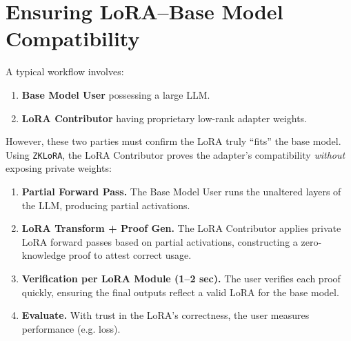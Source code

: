 \documentclass[11pt]{article}
\begin{document}
\section{Ensuring LoRA–Base Model Compatibility}

A typical workflow involves:
\begin{enumerate}
    \item \textbf{Base Model User} possessing a large LLM. 
    \item \textbf{LoRA Contributor} having proprietary low-rank adapter weights. 
\end{enumerate}
However, these two parties must confirm the LoRA truly “fits” the base model. Using \texttt{ZKLoRA}, the LoRA Contributor proves the adapter’s compatibility \emph{without} exposing private weights:

\begin{enumerate}
    \item \textbf{Partial Forward Pass.}
    The Base Model User runs the unaltered layers of the LLM, producing partial activations.

    \item \textbf{LoRA Transform + Proof Gen.}
    The LoRA Contributor applies private LoRA forward passes based on partial activations, constructing a zero-knowledge proof to attest correct usage.

    \item \textbf{Verification per LoRA Module (1--2 sec).}
    The user verifies each proof quickly, ensuring the final outputs reflect a valid LoRA for the base model.

    \item \textbf{Evaluate.}
    With trust in the LoRA’s correctness, the user measures performance (e.g. loss).
\end{enumerate}
\end{document}
